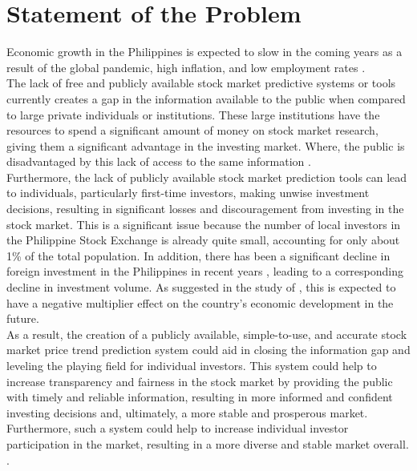 \section{Statement of the Problem}
\label{sec:problem}
Economic growth in the Philippines is expected to slow in the coming years as a 
result of the global pandemic, high inflation, and low employment rates
\cite{Alegado2022,Canto2022,Reuters2022}.
\hfill \\

The lack of free and publicly available stock market predictive systems or tools 
currently creates a gap in the information available to the public when compared 
to large private individuals or institutions. These large institutions have the 
resources to spend a significant amount of money on stock market research, giving 
them a significant advantage in the investing market. Where, the public is 
disadvantaged by this lack of access to the same information
\cite{Kim2022}. 
\hfill \\
 
Furthermore, the lack of publicly available stock market prediction tools can lead 
to individuals, particularly first-time investors, making unwise investment decisions, 
resulting in significant losses and discouragement from investing in the stock market. 
This is a significant issue because the number of local investors in the Philippine 
Stock Exchange is already quite small, accounting for only about 1\% of the total 
population. In addition, there has been a significant decline in foreign investment 
in the Philippines in recent years
\cite{BusinessWorld2022}, 
leading to a corresponding decline in investment volume. 
As suggested in the study of , 
this is expected to have a negative multiplier effect on the country's 
economic development in the future. 
\hfill \\
 
As a result, the creation of a publicly available, simple-to-use, and accurate 
stock market price trend prediction system could aid in closing the information 
gap and leveling the playing field for individual investors. This system could 
help to increase transparency and fairness in the stock market by providing the 
public with timely and reliable information, resulting in more informed and 
confident investing decisions and, ultimately, a more stable and prosperous market. 
Furthermore, such a system could help to increase individual investor participation 
in the market, resulting in a more diverse and stable market overall.
\cite{Statista2022,POPCOMM2021}.
\hfill \\

